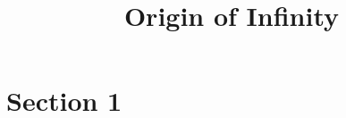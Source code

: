 \documentclass[]{article}
\title{Origin of Infinity}
\author{}
\begin{document}
\maketitle

\begin{abstract}

\end{abstract}

\section{Section 1}
\end{document}
